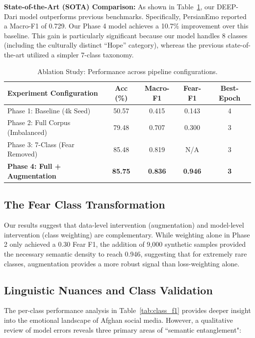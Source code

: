 \documentclass[runningheads]{llncs}
\begin{document}
\textbf{State-of-the-Art (SOTA) Comparison:} As shown in Table~\ref{tab:final_results}, our DEEP-Dari model outperforms previous benchmarks. Specifically, PersianEmo \cite{hussiny2024persianemo} reported a Macro-F1 of 0.729. Our Phase 4 model achieves a 10.7\% improvement over this baseline. This gain is particularly significant because our model handles 8 classes (including the culturally distinct ``Hope'' category), whereas the previous state-of-the-art utilized a simpler 7-class taxonomy.

\begin{table}[H]
\centering
\caption{Ablation Study: Performance across pipeline configurations.}
\label{tab:final_results}
\begin{tabular}{@{}lcccc@{}}
\toprule
\textbf{Experiment Configuration} & \textbf{Acc (\%)} & \textbf{Macro-F1} & \textbf{Fear-F1} & \textbf{Best-Epoch} \\ \midrule
Phase 1: Baseline (4k Seed) & 50.57 & 0.415 & 0.143 & 4 \\
Phase 2: Full Corpus (Imbalanced) & 79.48 & 0.707 & 0.300 & 3 \\
Phase 3: 7-Class (Fear Removed) & 85.48 & 0.819 & N/A & 3 \\
\textbf{Phase 4: Full + Augmentation} & \textbf{85.75} & \textbf{0.836} & \textbf{0.946} & \textbf{3} \\ \bottomrule
\end{tabular}
\end{table}

\subsection{The Fear Class Transformation}
Our results suggest that data-level intervention (augmentation) and model-level intervention (class weighting) are complementary. While weighting alone in Phase 2 only achieved a 0.30 Fear F1, the addition of 9,000 synthetic samples provided the necessary semantic density to reach 0.946, suggesting that for extremely rare classes, augmentation provides a more robust signal than loss-weighting alone.


\subsection{Linguistic Nuances and Class Validation}


The per-class performance analysis in Table~\ref{tab:class_f1} provides deeper 
insight into the emotional landscape of Afghan social media. However, a 
qualitative review of model errors reveals three primary areas of ``semantic entanglement":
\end{document}
